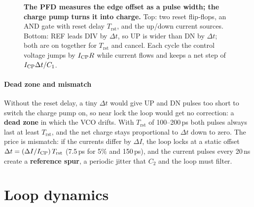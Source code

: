 \begin{figure}[tbp]
\caption{\textbf{The PFD measures the edge offset as a pulse width; the charge pump turns it into charge.} Top: two reset flip-flops, an AND gate with reset delay $T_\mathrm{rst}$, and the up/down current sources. Bottom: REF leads DIV by $\Delta t$, so UP is wider than DN by $\Delta t$; both are on together for $T_\mathrm{rst}$ and cancel. Each cycle the control voltage jumps by $I_\mathrm{CP} R$ while current flows and keeps a net step of $I_\mathrm{CP}\Delta t/C_1$.}
\label{fig:ch12-pfd}
\end{figure}

\paragraph{Dead zone and mismatch}
Without the reset delay, a tiny $\Delta t$ would give UP and DN pulses too short to switch the charge pump on, so near lock the loop would get no correction: a \textbf{dead zone} in which the VCO drifts. With $T_\mathrm{rst}$ of 100--200\,ps both pulses always last at least $T_\mathrm{rst}$, and the net charge stays proportional to $\Delta t$ down to zero. The price is mismatch: if the currents differ by $\Delta I$, the loop locks at a static offset $\Delta t = (\Delta I/I_\mathrm{CP})\,T_\mathrm{rst}$ (7.5\,ps for 5\% and 150\,ps), and the current pulses every 20\,ns create a \textbf{reference spur}, a periodic jitter that $C_2$ and the loop must filter.

\section{Loop dynamics}\label{sec:pll-loop}

